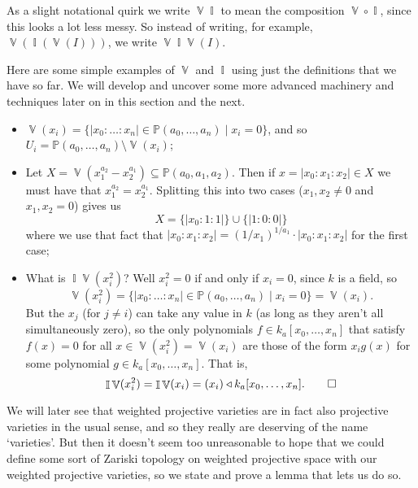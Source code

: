\documentclass[10pt,notitlepage]{article}
\numberwithin{equation}{subsection}
\DeclareMathOperator{\van}{\mathbb{V}}
\DeclareMathOperator{\ide}{\mathbb{I}}
\newcommand{\pee}{\mathbb{P}}
\newcommand{\kazn}{k_a[x_0,\ldots,x_n]}
\newcommand{\pazn}{\pee(a_0,\ldots,a_n)}
\newcommand{\pathree}{\pee(a_0,a_1,a_2)}
\begin{document}
    \begin{note}
        As a slight notational quirk we write $\van\ide$ to mean the composition $\van\circ\ide$, since this looks a lot less messy.
        So instead of writing, for example, $\van(\ide(\van(I)))$, we write $\van\ide\van(I)$.
    \end{note}


    \begin{example}
        Here are some simple examples of $\van$ and $\ide$ using just the definitions that we have so far.
        We will develop and uncover some more advanced machinery and techniques later on in this section and the next.
        \begin{itemize}
            \item $\van(x_i)=\{|x_0:\ldots:x_n|\in\pazn \mid x_i=0\}$, and so $U_i=\pazn\setminus\van(x_i)$;
            \item Let $X = \van(x_1^{a_2}-x_2^{a_1})\subseteq\pathree$.
            Then if $x=|x_0:x_1:x_2|\in X$ we must have that $x_1^{a_2}=x_2^{a_1}$.
            Splitting this into two cases ($x_1,x_2\neq0$ and $x_1,x_2=0$) gives us
            \[
                X= \{|x_0:1:1|\}\cup\{|1:0:0|\}
            \]
            where we use that fact that $|x_0:x_1:x_2|=\left(1/x_1\right)^{1/a_1}\cdot|x_0:x_1:x_2|$ for the first case;
            \item What is $\ide\van(x_i^2)$?
            Well $x_i^2=0$ if and only if $x_i=0$, since $k$ is a field, so
            \[
                \van(x_i^2) = \{|x_0:\ldots:x_n|\in\pazn \mid x_i=0\} = \van(x_i).
            \]
            But the $x_j$ (for $j\neq i$) can take any value in $k$ (as long as they aren't all simultaneously zero), so the only polynomials $f\in\kazn$ that satisfy $f(x)=0$ for all $x\in\van(x_i^2)=\van(x_i)$ are those of the form $x_ig(x)$ for some polynomial $g\in\kazn$.
            That is,
            \[
                \ide\van(x_i^2) = \ide\van(x_i) = (x_i) \triangleleft \kazn.\qedhere
            \]
        \end{itemize}
    \end{example}







    We will later see that weighted projective varieties are in fact also projective varieties in the usual sense, and so they really are deserving of the name `varieties'.
    But then it doesn't seem too unreasonable to hope that we could define some sort of Zariski topology on weighted projective space with our weighted projective varieties, so we state and prove a lemma that lets us do so.
\end{document}

